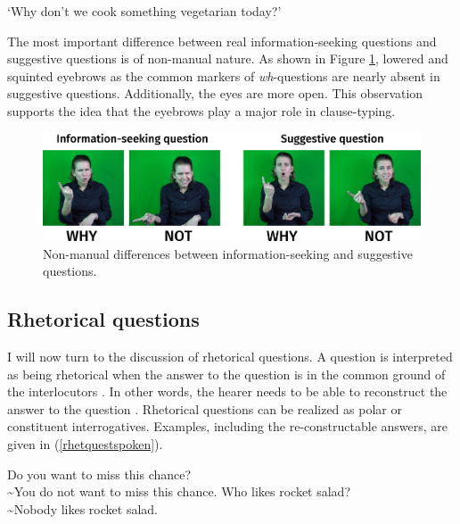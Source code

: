 \begin{exe}
\ex {}
\glt `Why don't we cook something vegetarian today?' \label{ex:suggquest}
\end{exe}

\noindent The most important difference between real information-seeking questions and suggestive questions is of non-manual nature. As shown in Figure \ref{suggquest}, lowered and squinted eyebrows as the common markers of \textit{wh}-questions are nearly absent in suggestive questions. Additionally, the eyes are more open. This observation supports the idea that the eyebrows play a major role in clause-typing. 

\begin{figure}[bt]
\centering
	\includegraphics[width=1.0\textwidth]{suggquest.jpg}
	\caption{Non-manual differences between information-seeking and suggestive questions. }
	\label{suggquest}
\end{figure}




\subsection{Rhetorical questions}\label{rhetq}
I will now turn to the discussion of rhetorical questions. A question is interpreted as being rhetorical when the answer to the question is in the common ground of the interlocutors \citep{caponigro2007rhetorical}. In other words, the hearer needs to be able to reconstruct the answer to the question \citep{truckenbrodt2004strukturbedeutung}. Rhetorical questions can be realized as polar or constituent interrogatives. Examples, including the re-constructable answers, are given in (\ref{rhetquestspoken}). 

\begin{exe}
\ex\label{rhetquestspoken}\begin{xlist}
\ex Do you want to miss this chance? \\
\textasciitilde You do not want to miss this chance. \label{polarrhet}
\ex Who likes rocket salad? \\
\textasciitilde Nobody likes rocket salad. \label{constituentrhet}
\end{xlist}
\end{exe} 

